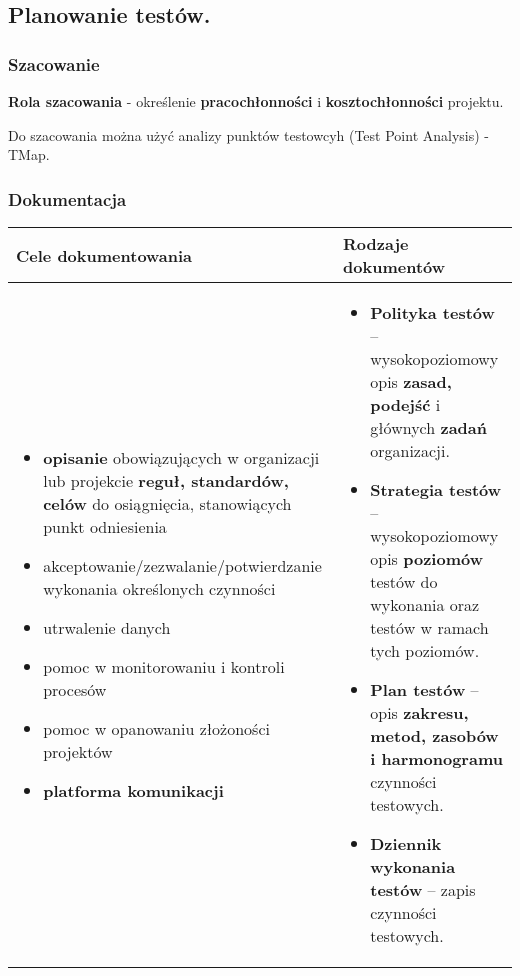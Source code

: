 \documentclass[../main.tex]{subfiles}
\begin{document}
    \subsection{Planowanie testów.}
    \subsubsection{Szacowanie}
    \textbf{Rola szacowania} - określenie \textbf{pracochłonności} i \textbf{kosztochłonności} projektu.

    Do szacowania można użyć analizy punktów testowcyh (Test Point Analysis) - TMap.

    \subsubsection{Dokumentacja}

    \begin{table}[H]
        \begin{center}
            \begin{tabular}{p{8cm} | p{8cm}}
                \textbf{Cele dokumentowania} & \textbf{Rodzaje dokumentów}\\
                \hline
                \begin{itemize}
                    \item \textbf{opisanie} obowiązujących w organizacji lub projekcie \textbf{reguł, standardów, celów} do osiągnięcia, stanowiących punkt odniesienia
                    \item akceptowanie/zezwalanie/potwierdzanie wykonania określonych czynności
                    \item utrwalenie danych
                    \item pomoc w monitorowaniu i kontroli procesów
                    \item pomoc w opanowaniu złożoności projektów
                    \item \textbf{platforma komunikacji}
                \end{itemize}
                &
                \begin{itemize}
                    \item \textbf{Polityka testów} – wysokopoziomowy opis \textbf{zasad, podejść} i głównych \textbf{zadań} organizacji.
                    \item \textbf{Strategia testów} – wysokopoziomowy opis \textbf{poziomów} testów do wykonania oraz testów w ramach tych poziomów.
                    \item \textbf{Plan testów} – opis \textbf{zakresu, metod, zasobów i harmonogramu} czynności testowych.
                    \item \textbf{Dziennik wykonania testów} – zapis czynności testowych.
                \end{itemize}\\
                \hline
            \end{tabular}
        \end{center}
    \end{table}
\end{document}
